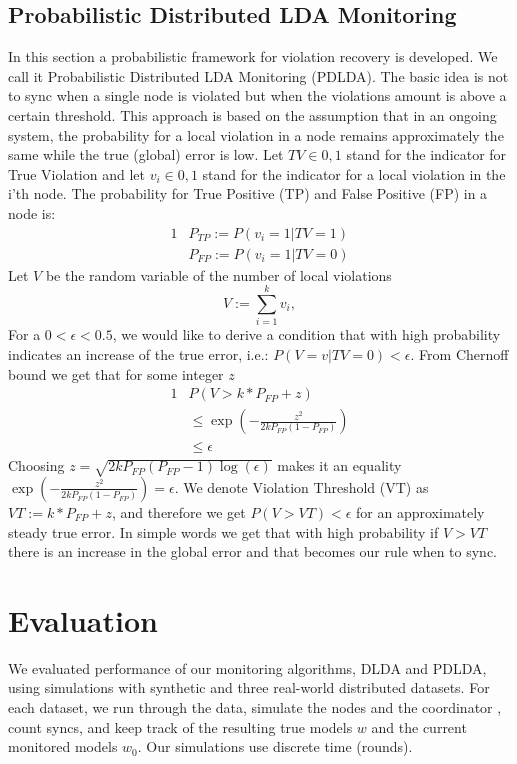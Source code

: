 \documentclass[11pt,twocolumn,varwidth=true,a4paper,fleqn]{article}
\begin{document}
\subsection{Probabilistic Distributed LDA Monitoring}
In this section a probabilistic framework for violation recovery is developed.
We call it Probabilistic Distributed LDA Monitoring (PDLDA). The basic idea is
not to sync when a single node is violated but when the violations amount is
above a certain threshold. 
This approach is based on the assumption that in an ongoing system, 
the probability for a local violation in a node remains approximately the same
while the true (global) error is low. 
Let $TV \in {0,1}$ stand for the indicator for True
Violation 
and let $v_i \in {0,1}$ stand for the indicator for a local violation in the
i'th node. The probability for True Positive (TP) and False Positive (FP) in a
node is:
\begin{alignat*}{1}
& P_{TP} := P(v_i=1 | TV=1) \\
& P_{FP} := P(v_i=1 | TV=0)
\end{alignat*}
Let $V$ be the random variable of the number of local violations
\begin{equation*}
V := \sum_{i=1}^k v_i,
\end{equation*}
For a $0 < \epsilon < 0.5$, we would like to derive a condition that 
with high probability indicates an increase of the true error, i.e.:
$P(V=v|TV=0) < \epsilon$. 
From Chernoff bound we get that for some integer $z$
\begin{alignat*}{1}
& P(V>k*P_{FP}+z) \\
& \leq \exp(-\frac{z^2}{2kP_{FP}(1-P_{FP})}) \\
& \leq \epsilon
\end{alignat*}
Choosing $z=\sqrt{2kP_{FP}(P_{FP}-1)\log(\epsilon)}$ makes it an equality  
$\exp(-\frac{z^2}{2kP_{FP}(1-P_{FP})}) = \epsilon$. We denote Violation
Threshold (VT) as $VT:=k*P_{FP}+z$, and therefore we get 
$P(V > VT) < \epsilon$ for an approximately steady true error.
In simple words we get that with high probability if $V > VT$ there is an
increase in the global error and that becomes our rule when to sync.
\section{Evaluation}
We evaluated performance of our monitoring algorithms,
DLDA and PDLDA, using simulations with synthetic and three
real-world distributed datasets. For each dataset, we run through 
the data, simulate the nodes and the coordinator , count syncs,
and keep track of the resulting true models $w$ and the
current monitored models $w_0$. Our simulations use discrete
time (rounds).
\end{document}
